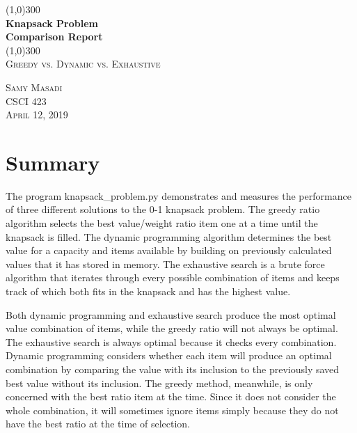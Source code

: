 \documentclass{article}
\begin{document}
\begin{titlepage}
    \begin{center}
    \line(1,0){300} \\
    [0.2in]
    \huge{\bfseries Knapsack Problem\\ Comparison Report} \\
    \line(1,0){300} \\
    [1.5cm]
    \textsc{\LARGE Greedy vs. Dynamic vs. Exhaustive}\\
    [15cm]
    \end{center}
    \begin{flushright}
    \textsc{\large Samy Masadi\\
    CSCI 423\\
    April 12, 2019}
    \end{flushright}
\end{titlepage}

\tableofcontents
\thispagestyle{empty}
\cleardoublepage

\setcounter{page}{1}

\section{Summary}
\hspace{\parindent}The program knapsack\_problem.py demonstrates and measures the performance of three different solutions to the 0-1 knapsack problem. The greedy ratio algorithm selects the best value/weight ratio item one at a time until the knapsack is filled. The dynamic programming algorithm determines the best value for a capacity and items available by building on previously calculated values that it has stored in memory. The exhaustive search is a brute force algorithm that iterates through every possible combination of items and keeps track of which both fits in the knapsack and has the highest value.

Both dynamic programming and exhaustive search produce the most optimal value combination of items, while the greedy ratio will not always be optimal. The exhaustive search is always optimal because it checks every combination. Dynamic programming considers whether each item will produce an optimal combination by comparing the value with its inclusion to the previously saved best value without its inclusion. The greedy method, meanwhile, is only concerned with the best ratio item at the time. Since it does not consider the whole combination, it will sometimes ignore items simply because they do not have the best ratio at the time of selection.
\end{document}
